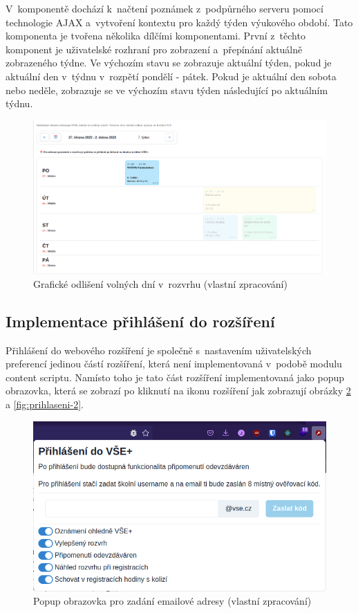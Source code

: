 V~komponentě  dochází k~načtení poznámek z~podpůrného serveru pomocí technologie AJAX a~vytvoření kontextu pro každý týden výukového období. Tato komponenta je tvořena několika dílčími komponentami. První z~těchto komponent je uživatelské rozhraní pro zobrazení a~přepínání aktuálně zobrazeného týdne. Ve výchozím stavu se zobrazuje aktuální týden, pokud je aktuální den v~týdnu v~rozpětí pondělí - pátek. Pokud je aktuální den sobota nebo neděle, zobrazuje se ve výchozím stavu týden následující po aktuálním týdnu.   

\begin{figure}[H]\centering
    \includegraphics[width=\textwidth]{img/rozvrh-volne-dny.png}
    \caption{Grafické odlišení volných dní v~rozvrhu (vlastní zpracování)}
    \label{fig:rovrh-volne-dny}
\end{figure}

\subsection{Implementace přihlášení do rozšíření}

Přihlášení do webového rozšíření je společně s~nastavením uživatelských preferencí jedinou částí rozšíření, která není implementovaná v~podobě modulu content scriptu. Namísto toho je tato část rozšíření implementovaná jako popup obrazovka, která se zobrazí po kliknutí na ikonu rozšíření jak zobrazují obrázky \ref{fig:prihlaseni-1} a \ref{fig:prihlaseni-2}.

\begin{figure}[H]\centering
    \includegraphics[width=\textwidth]{img/prihlaseni-vse-plus.png}
    \caption{Popup obrazovka pro zadání emailové adresy (vlastní zpracování)}
    \label{fig:prihlaseni-1}
\end{figure}


